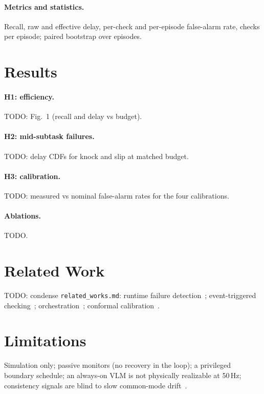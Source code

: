 \documentclass[11pt]{article}
\begin{document}
\paragraph{Metrics and statistics.} Recall, raw and effective delay, per-check and per-episode false-alarm rate, checks per episode; paired bootstrap over episodes.

\section{Results}
\paragraph{H1: efficiency.} TODO: Fig.~1 (recall and delay vs budget).
\paragraph{H2: mid-subtask failures.} TODO: delay CDFs for knock and slip at matched budget.
\paragraph{H3: calibration.} TODO: measured vs nominal false-alarm rates for the four calibrations.
\paragraph{Ablations.} TODO.

\section{Related Work}
TODO: condense \texttt{related\_works.md}: runtime failure detection~\citep{xu2025faildetect,romer2025fiper,agia2024sentinel}; event-triggered checking~\citep{care2026,contactguard2026,checkvla2026}; orchestration~\citep{gemini2025robotics15,orchestrating2026}; conformal calibration~\citep{vovk2005alrw,angelopoulos2021gentle,adaptivetrigger2026}.

\section{Limitations}
Simulation only; passive monitors (no recovery in the loop); a privileged boundary schedule; an always-on VLM is not physically realizable at 50\,Hz; consistency signals are blind to slow common-mode drift~\citep{mediante2026}.



\end{document}
